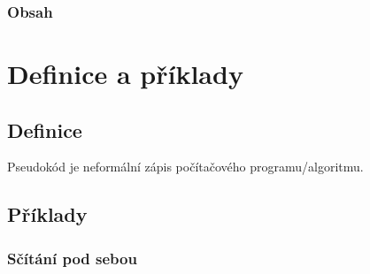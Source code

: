 \documentclass[aspectratio=169,11pt,handout]{beamer}
\begin{document}
\begin{frame}
 \frametitle{Obsah}
 \tableofcontents
\end{frame}

\section[Definice a příklady]{Definice a příklady}
\subsection[Definice]{Definice}

\begin{frame}
 \begin{tcolorbox}[title=Pseudokód,center,width=.95\textwidth]
  Pseudokód je \alert{neformální} zápis počítačového programu/algoritmu.
 \end{tcolorbox}
\end{frame}

\subsection[Příklady]{Příklady}

\begin{frame}
 \frametitle{Sčítání pod sebou}
 \centering
 \begin{minipage}{.8\textwidth}
 \end{minipage}
\end{frame}
\end{document}

